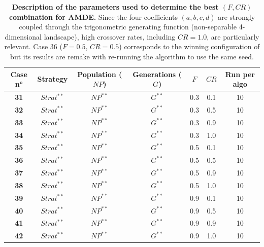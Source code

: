 \documentclass[12pt, openany]{article}
\begin{document}
\begin{table}[H]
    \centering
    \renewcommand{\arraystretch}{1.5}
    \begin{tabular}{|c|c|c|c|c|c|c|}
        \hline 
        \textbf{Case n°} & \textbf{Strategy} & \textbf{Population ($NP$)} & \textbf{Generations ($G$)} & $F$ & $CR$ & \textbf{Run per algo} \\ \hline

        \textbf{31} & $Strat^{**}$ & $NP^{**}$ & $G^{**}$ & 0.3 & 0.1 & 10 \\ \hdashline
        \textbf{32} & $Strat^{**}$ & $NP^{**}$ & $G^{**}$ & 0.3 & 0.5 & 10 \\ \hdashline
        \textbf{33} & $Strat^{**}$ & $NP^{**}$ & $G^{**}$ & 0.3 & 0.9 & 10 \\ \hdashline
        \textbf{34} & $Strat^{**}$ & $NP^{**}$ & $G^{**}$ & 0.3 & 1.0 & 10 \\ \hline
        \textbf{35} & $Strat^{**}$ & $NP^{**}$ & $G^{**}$ & 0.5 & 0.1 & 10 \\ \hdashline
        \textbf{36} & $Strat^{**}$ & $NP^{**}$ & $G^{**}$ & 0.5 & 0.5 & 10 \\ \hdashline
        \textbf{37} & $Strat^{**}$ & $NP^{**}$ & $G^{**}$ & 0.5 & 0.9 & 10 \\ \hdashline
        \textbf{38} & $Strat^{**}$ & $NP^{**}$ & $G^{**}$ & 0.5 & 1.0 & 10 \\ \hline
        \textbf{39} & $Strat^{**}$ & $NP^{**}$ & $G^{**}$ & 0.9 & 0.1 & 10 \\ \hdashline
        \textbf{40} & $Strat^{**}$ & $NP^{**}$ & $G^{**}$ & 0.9 & 0.5 & 10 \\ \hdashline
        \textbf{41} & $Strat^{**}$ & $NP^{**}$ & $G^{**}$ & 0.9 & 0.9 & 10 \\ \hdashline
        \textbf{42} & $Strat^{**}$ & $NP^{**}$ & $G^{**}$ & 0.9 & 1.0 & 10 \\ 
        \hline
    \end{tabular}
    \caption{\textbf{Description of the parameters used to determine the best $(F, CR)$ combination for AMDE.} Since the four coefficients $(a,b,c,d)$ are strongly coupled through the trigonometric generating function (non-separable 4-dimensional landscape), high crossover rates, including $CR=1.0$, are particularly relevant. Case 36 ($F=0.5$, $CR=0.5$) corresponds to the winning configuration of  but its results are remake with re-running the algorithm to use the same seed.}
    \label{tab:Cases_Determine_AMDE_F_CR}
\end{table}
\end{document}
